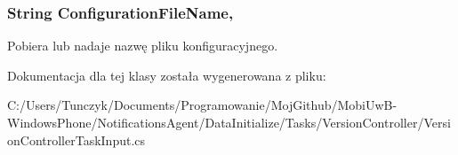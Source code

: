 \subsubsection[{Configuration\+File\+Name}]{\setlength{\rightskip}{0pt plus 5cm}String Configuration\+File\+Name\hspace{0.3cm}{\ttfamily [get]}, {\ttfamily [set]}}\label{a00083_aad653661b10a007ae064fd7910ac59d8}


Pobiera lub nadaje nazwę pliku konfiguracyjnego. 



Dokumentacja dla tej klasy została wygenerowana z pliku\+:\begin{DoxyCompactItemize}
\item 
C\+:/\+Users/\+Tunczyk/\+Documents/\+Programowanie/\+Moj\+Github/\+Mobi\+Uw\+B-\/\+Windows\+Phone/\+Notifications\+Agent/\+Data\+Initialize/\+Tasks/\+Version\+Controller/Version\+Controller\+Task\+Input.\+cs\end{DoxyCompactItemize}
